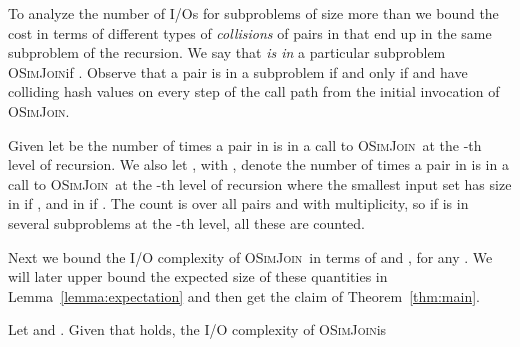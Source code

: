 \documentclass{llncs}
\newcommand{\SimJoin}{\textsc{OSimJoin}}
\begin{document}
To analyze the number of I/Os for subproblems of size more than  we bound the cost in terms of different types of \emph{collisions} of pairs in  that end up in the same subproblem of the recursion. 
We say that  \emph{is in} a particular subproblem \SimJoin if . 
Observe that a pair  is in a subproblem if and only if  and  have colliding hash values on every step of the call path from the initial invocation of \SimJoin.

\newcommand{\C}[2][i]{C_{#1}\left({#2} \right)}
\begin{definition}

Given  let  be the number of times a pair in  is in a call to \SimJoin\ at the -th level of recursion. 
We also let , with , denote the number of times a pair in  is in a call to \SimJoin\ at the -th level of recursion where the smallest input set has size in  if , and in  if . 
The count is over all pairs and with multiplicity, so if  is in several subproblems at the -th level, all these are counted.

\end{definition}

Next we bound the I/O complexity of \SimJoin\ in terms of  and , for any . 
We will later upper bound the expected size of these quantities in Lemma~\ref{lemma:expectation} and then get the claim of Theorem~\ref{thm:main}. 

\begin{lemma}\label{lem:collision-bound}

Let  and . Given that  holds,  the I/O complexity of \SimJoin is


\end{lemma}
\end{document}
